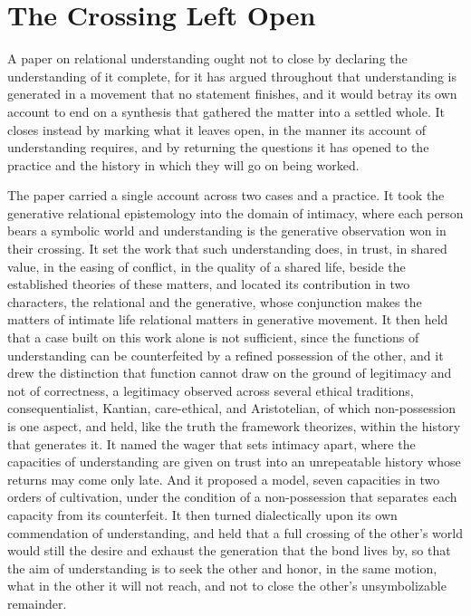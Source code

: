 \section{The Crossing Left Open}
\label{p27:sec:close}

\noindent
A paper on relational understanding ought not to close by declaring the understanding of it complete, for it has argued throughout that understanding is generated in a movement that no statement finishes, and it would betray its own account to end on a synthesis that gathered the matter into a settled whole. It closes instead by marking what it leaves open, in the manner its account of understanding requires, and by returning the questions it has opened to the practice and the history in which they will go on being worked.

The paper carried a single account across two cases and a practice. It took the generative relational epistemology into the domain of intimacy, where each person bears a symbolic world and understanding is the generative observation won in their crossing. It set the work that such understanding does, in trust, in shared value, in the easing of conflict, in the quality of a shared life, beside the established theories of these matters, and located its contribution in two characters, the relational and the generative, whose conjunction makes the matters of intimate life relational matters in generative movement. It then held that a case built on this work alone is not sufficient, since the functions of understanding can be counterfeited by a refined possession of the other, and it drew the distinction that function cannot draw on the ground of legitimacy and not of correctness, a legitimacy observed across several ethical traditions, consequentialist, Kantian, care-ethical, and Aristotelian, of which non-possession is one aspect, and held, like the truth the framework theorizes, within the history that generates it. It named the wager that sets intimacy apart, where the capacities of understanding are given on trust into an unrepeatable history whose returns may come only late. And it proposed a model, seven capacities in two orders of cultivation, under the condition of a non-possession that separates each capacity from its counterfeit. It then turned dialectically upon its own commendation of understanding, and held that a full crossing of the other's world would still the desire and exhaust the generation that the bond lives by, so that the aim of understanding is to seek the other and honor, in the same motion, what in the other it will not reach, and not to close the other's unsymbolizable remainder.

